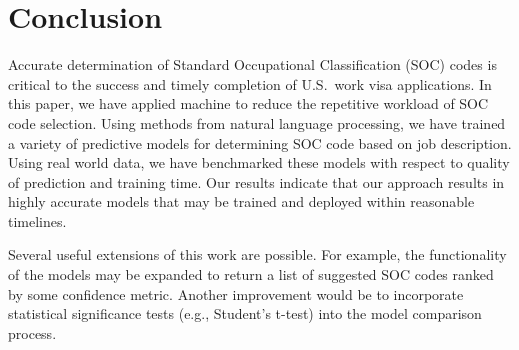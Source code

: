 \section{Conclusion}
\label{sec:Conclusion}

Accurate determination of Standard Occupational Classification (SOC) codes is critical to the success and timely completion of U.S.~work visa applications. In this paper, we have applied machine to reduce the repetitive workload of SOC code selection. Using methods from natural language processing, we have trained a variety of predictive models for determining SOC code based on job description. Using real world data, we have benchmarked these models with respect to quality of prediction and training time. Our results indicate that our approach results in highly accurate models that may be trained and deployed within reasonable timelines.

Several useful extensions of this work are possible. For example, the functionality of the models may be expanded to return a list of suggested SOC codes ranked by some confidence metric. Another improvement would be to incorporate statistical significance tests (e.g., Student's t-test) into the model comparison process.
